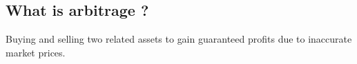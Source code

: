 \documentclass[11pt]{scrartcl} %
\begin{document}
\subsection{What is arbitrage ?}

Buying and selling two related assets to gain guaranteed profits due to inaccurate market prices.







\end{document}
